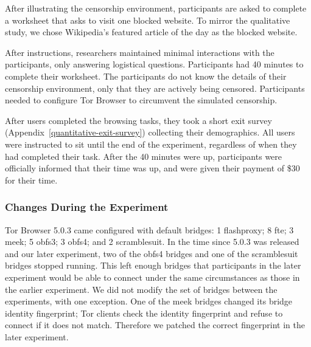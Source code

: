 \documentclass[USenglish,oneside,twocolumn]{article}
\begin{document}
After illustrating the censorship environment, participants are asked to 
complete a worksheet that asks to visit one blocked website. 
To mirror the qualitative study, we chose Wikipedia's featured article of the day 
as the blocked website. 

After instructions, researchers maintained minimal interactions with the participants, 
only answering logistical questions. Participants had
40 minutes to complete their worksheet. 
The participants do not know the details of their censorship environment,
only that they are actively being censored. Participants needed to configure Tor Browser to 
circumvent the simulated censorship. 

After users completed the browsing tasks, they took a short exit survey (Appendix~\ref{quantitative-exit-survey})
collecting their demographics. All users were instructed to sit until the end of the experiment,
regardless of when they had completed their task. After the 40 minutes were up, 
participants were officially informed that their time was up, and were given their payment of 
\$30 for their time. 

\subsubsection{Changes During the Experiment} 

Tor Browser 5.0.3 came configured with default bridges:
1 flashproxy;
8 fte;
3 meek;
5 obfs3;
3 obfs4;
and 2 scramblesuit.
In the time since 5.0.3 was released and our later experiment,
two of the obfs4 bridges and one of the scramblesuit bridges stopped running.
This left enough bridges that participants in the later experiment would be able to connect
under the same circumstances as those in the earlier experiment.
We did not modify the set of bridges between the experiments,
with one exception.
One of the meek bridges changed its bridge identity fingerprint;
Tor clients check the identity fingerprint and refuse to connect
if it does not match.
Therefore we patched the correct fingerprint in the later experiment.
\end{document}
